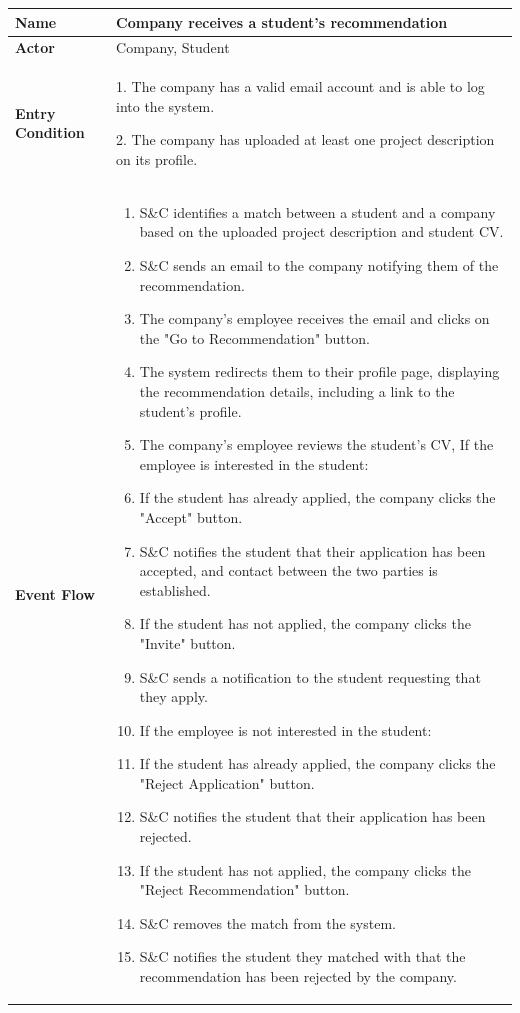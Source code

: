 \begin{longtable}{|p{}|p{}|}
\hline
\textbf{Name} &  Company receives a student's recommendation\\
\hline
\textbf{Actor} &  Company, Student\\
\hline
\textbf{Entry Condition} &  
1. The company has a valid email account and is able to log into the system.

2. The company has uploaded at least one project description on its profile.\\
\hline
\textbf{Event Flow} &  
\begin{enumerate}
\item S\&C identifies a match between a student and a company based on the uploaded project description and student CV.	
\item S\&C sends an email to the company notifying them of the recommendation.
\item  The company’s employee receives the email and clicks on the "Go to Recommendation" button.
\item  The system redirects them to their profile page, displaying the recommendation details, including a link to the student's profile.
\item The company’s employee reviews the student’s CV, If the employee is interested in the student:
\item  If the student has already applied, the company clicks the "Accept" button.
\item S\&C notifies the student that their application has been accepted, and contact between the two parties is established.
\item  If the student has not applied, the company clicks the "Invite" button.
\item S\&C sends a notification to the student requesting that they apply.
\item If the employee is not interested in the student:
\item If the student has already applied, the company clicks the "Reject Application" button.
\item S\&C notifies the student that their application has been rejected.
\item  If the student has not applied, the company clicks the "Reject Recommendation" button.
\item S\&C removes the match from the system.
\item S\&C notifies the student they matched with that the recommendation has been rejected by the company. 

\end{enumerate}
\end{longtable}
